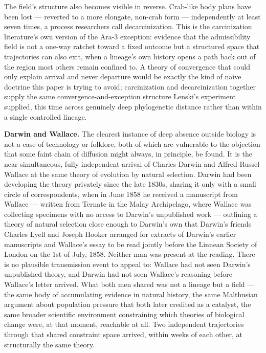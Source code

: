 \documentclass[11pt]{article}
\theoremstyle{plain}
\begin{document}
The field's structure also becomes visible in reverse. Crab-like body plans have been lost --- reverted to a more elongate, non-crab form --- independently at least seven times, a process researchers call decarcinization. This is the carcinization literature's own version of the Ara-3 exception: evidence that the admissibility field is not a one-way ratchet toward a fixed outcome but a structured space that trajectories can also exit, when a lineage's own history opens a path back out of the region most others remain confined to. A theory of convergence that could only explain arrival and never departure would be exactly the kind of naive doctrine this paper is trying to avoid; carcinization and decarcinization together supply the same convergence-and-exception structure Lenski's experiment supplied, this time across genuinely deep phylogenetic distance rather than within a single controlled lineage.

\textbf{Darwin and Wallace.} The clearest instance of deep absence outside biology is not a case of technology or folklore, both of which are vulnerable to the objection that some faint chain of diffusion might always, in principle, be found. It is the near-simultaneous, fully independent arrival of Charles Darwin and Alfred Russel Wallace at the same theory of evolution by natural selection. Darwin had been developing the theory privately since the late 1830s, sharing it only with a small circle of correspondents, when in June 1858 he received a manuscript from Wallace --- written from Ternate in the Malay Archipelago, where Wallace was collecting specimens with no access to Darwin's unpublished work --- outlining a theory of natural selection close enough to Darwin's own that Darwin's friends Charles Lyell and Joseph Hooker arranged for extracts of Darwin's earlier manuscripts and Wallace's essay to be read jointly before the Linnean Society of London on the 1st of July, 1858. Neither man was present at the reading. There is no plausible transmission event to appeal to: Wallace had not seen Darwin's unpublished theory, and Darwin had not seen Wallace's reasoning before Wallace's letter arrived. What both men shared was not a lineage but a field --- the same body of accumulating evidence in natural history, the same Malthusian argument about population pressure that both later credited as a catalyst, the same broader scientific environment constraining which theories of biological change were, at that moment, reachable at all. Two independent trajectories through that shared constraint space arrived, within weeks of each other, at structurally the same theory.
\end{document}
